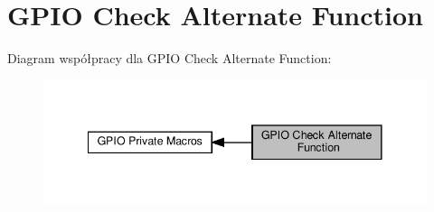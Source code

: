 \hypertarget{group___g_p_i_o_ex___i_s___alternat__function__selection}{}\section{G\+P\+IO Check Alternate Function}
\label{group___g_p_i_o_ex___i_s___alternat__function__selection}
Diagram współpracy dla G\+P\+IO Check Alternate Function\+:\nopagebreak
\begin{figure}[H]
\begin{center}
\leavevmode
\includegraphics[width=341pt]{group___g_p_i_o_ex___i_s___alternat__function__selection}
\end{center}
\end{figure}

